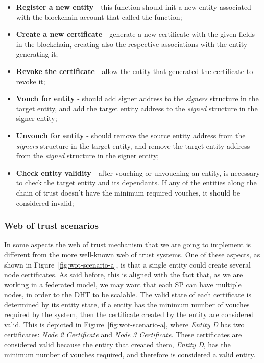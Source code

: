 \begin{itemize}
  \item \textbf{Register a new entity} - this function should init a new entity associated with the blockchain account that called the function;
  \item \textbf{Create a new certificate} - generate a new certificate with the given fields in the blockchain, creating also the respective associations with the entity generating it;
  \item \textbf{Revoke the certificate} - allow the entity that generated the certificate to revoke it;
  \item \textbf{Vouch for entity} - should add signer address to the \textit{signers} structure in the target entity, and add the target entity address to the \textit{signed} structure in the signer entity;
  \item \textbf{Unvouch for entity} - should remove the source entity address from the \textit{signers} structure in the target entity, and remove the target entity address from the \textit{signed} structure in the signer entity;
  \item \textbf{Check entity validity} - after vouching or unvouching an entity, is necessary to check the target entity and its dependants. If any of the entities along the chain of trust doesn't have the minimum required vouches, it should be considered invalid;
\end{itemize}


\subsubsection{Web of trust scenarios}

In some aspects the web of trust mechanism that we are going to implement is different from the more well-known web of trust systems.
One of these aspects, as shown in Figure~\ref{fig:wot-scenario-a}, is that a single entity could create several node certificates.
As said before, this is aligned with the fact that, as we are working in a federated model, we may want that each \ac{SP} can have multiple nodes, in order to the \ac{DHT} to be scalable.
The valid state of each certificate is determined by its entity state, if a entity has the minimum number of vouches required by the system, then the certificate created by the entity are considered valid.
This is depicted in Figure~\ref{fig:wot-scenario-a}, where \textit{Entity D} has two certificates: \textit{Node 2 Certificate} and \textit{Node 3 Certificate}.
These certificates are considered valid because the entity that created them, \textit{Entity D}, has the minimum number of vouches required, and therefore is considered a valid entity.


